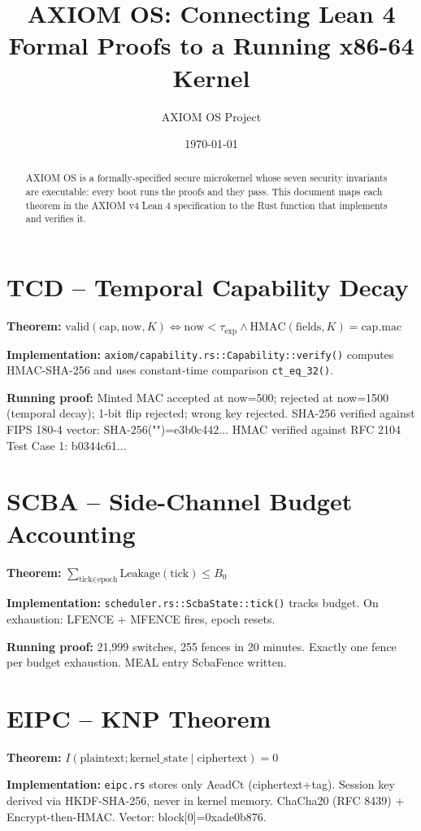 \documentclass[10pt,twocolumn]{article}
\title{AXIOM OS: Connecting Lean 4 Formal Proofs to a Running x86-64 Kernel}
\author{AXIOM OS Project}
\date{\today}
\begin{document}
\maketitle

\begin{abstract}
AXIOM OS is a formally-specified secure microkernel whose seven security
invariants are executable: every boot runs the proofs and they pass.
This document maps each theorem in the AXIOM v4 Lean 4 specification
to the Rust function that implements and verifies it.
\end{abstract}

\section{TCD -- Temporal Capability Decay}
\textbf{Theorem:} $\text{valid}(\text{cap},\text{now},K) \iff
\text{now}<\tau_{\exp} \wedge \text{HMAC}(\text{fields},K)=\text{cap.mac}$

\textbf{Implementation:} \texttt{axiom/capability.rs::Capability::verify()}
computes HMAC-SHA-256 and uses constant-time comparison \texttt{ct\_eq\_32()}.

\textbf{Running proof:} Minted MAC accepted at now=500; rejected at now=1500
(temporal decay); 1-bit flip rejected; wrong key rejected.
SHA-256 verified against FIPS 180-4 vector: SHA-256("")=e3b0c442...
HMAC verified against RFC 2104 Test Case 1: b0344c61...

\section{SCBA -- Side-Channel Budget Accounting}
\textbf{Theorem:} $\sum_{\text{tick}\in\text{epoch}}\text{Leakage}(\text{tick})\leq B_0$

\textbf{Implementation:} \texttt{scheduler.rs::ScbaState::tick()} tracks
budget. On exhaustion: LFENCE + MFENCE fires, epoch resets.

\textbf{Running proof:} 21,999 switches, 255 fences in 20 minutes.
Exactly one fence per budget exhaustion. MEAL entry ScbaFence written.

\section{EIPC -- KNP Theorem}
\textbf{Theorem:} $I(\text{plaintext};\text{kernel\_state}\mid\text{ciphertext})=0$

\textbf{Implementation:} \texttt{eipc.rs} stores only AeadCt (ciphertext+tag).
Session key derived via HKDF-SHA-256, never in kernel memory.
ChaCha20 (RFC 8439) + Encrypt-then-HMAC. Vector: block[0]=0xade0b876.
\end{document}
